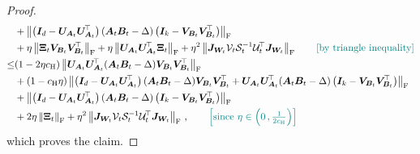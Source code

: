 \begin{proof}
\begin{align}
    & + \left\|\left(\bm I_d - \bm U_{\bm A_t} \bm U_{\bm A_t}^{\!\top}\right)(\bm A_t \bm B_t - \Delta)\left(\bm I_k - \bm V_{\bm B_t} \bm V_{\bm B_t}^{\!\top}\right)\right\|_{\rm F}\nonumber\\
    & + \eta \left\|\bm \Xi_t \bm V_{\bm B_t} \bm V_{\bm B_t}^{\!\top}\right\|_{\rm F} + \eta \left\|\bm U_{\bm A_t} \bm U_{\bm A_t}^{\!\top} \bm \Xi_t\right\|_{\rm F} + \eta^2 \left\|\bm J_{\bm W_t} \mathcal{V}_t \mathcal{S}_t^{-1} \mathcal{U}^{\!\top}_t\bm J_{\bm W_t}\right\|_{\rm F}\tag*{\color{teal}[by triangle inequality]}\nonumber\\
    \leq & (1-2\eta c_{\rm H})\left\|\bm U_{\bm A_t} \bm U_{\bm A_t}^{\!\top}(\bm A_t \bm B_t - \Delta)\bm V_{\bm B_t} \bm V_{\bm B_t}^{\!\top}\right\|_{\rm F}\nonumber\\
    & + (1-c_{\rm H}\eta) \left\|\left(\bm I_d - \bm U_{\bm A_t} \bm U_{\bm A_t}^{\!\top}\right)(\bm A_t \bm B_t - \Delta)\bm V_{\bm B_t} \bm V_{\bm B_t}^{\!\top}+\bm U_{\bm A_t} \bm U_{\bm A_t}^{\!\top}(\bm A_t \bm B_t - \Delta)\left(\bm I_k - \bm V_{\bm B_t} \bm V_{\bm B_t}^{\!\top}\right)\right\|_{\rm F}\nonumber\\
    & + \left\|\left(\bm I_d - \bm U_{\bm A_t} \bm U_{\bm A_t}^{\!\top}\right)(\bm A_t \bm B_t - \Delta)\left(\bm I_k - \bm V_{\bm B_t} \bm V_{\bm B_t}^{\!\top}\right)\right\|_{\rm F}\nonumber\\
    & + 2\eta\left\|\bm \Xi_t\right\|_{\rm F}+\eta^2\left\|\bm J_{\bm W_t} \mathcal{V}_t \mathcal{S}_t^{-1} \mathcal{U}^{\!\top}_t\bm J_{\bm W_t}\right\|_{\rm F}\,,\tag*{\color{teal}$\left[\text{since }\eta\in\left(0\,,\frac{1}{2c_{\rm H}}\right)\right]$}\nonumber
\end{align}
which proves the claim.
\end{proof}

